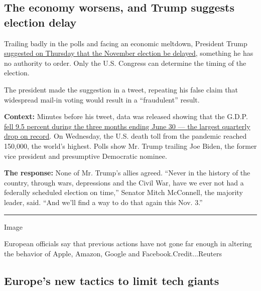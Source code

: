 \hypertarget{the-economy-worsens-and-trump-suggests-election-delay}{%
\subsection{The economy worsens, and Trump suggests election
delay}\label{the-economy-worsens-and-trump-suggests-election-delay}}

Trailing badly in the polls and facing an economic meltdown, President
Trump
\href{https://www.nytimes.com/2020/07/30/us/elections/biden-vs-trump.html}{suggested
on Thursday that the November election be delayed}, something he has no
authority to order. Only the U.S. Congress can determine the timing of
the election.

The president made the suggestion in a tweet, repeating his false claim
that widespread mail-in voting would result in a ``fraudulent'' result.

\textbf{Context:} Minutes before his tweet, data was released showing
that the G.D.P.
\href{https://www.nytimes.com/live/2020/07/30/business/stock-market-today-coronavirus?action=click\&module=Top\%20Stories\&pgtype=Homepage}{fell
9.5 percent during the three months ending June 30 --- the largest
quarterly drop on record}. On Wednesday, the U.S. death toll from the
pandemic reached 150,000, the world's highest. Polls show Mr. Trump
trailing Joe Biden, the former vice president and presumptive Democratic
nominee.

\textbf{The response:} None of Mr. Trump's allies agreed. ``Never in the
history of the country, through wars, depressions and the Civil War,
have we ever not had a federally scheduled election on time,'' Senator
Mitch McConnell, the majority leader, said. ``And we'll find a way to do
that again this Nov. 3.''

\begin{center}\rule{0.5\linewidth}{\linethickness}\end{center}

Image

European officials say that previous actions have not gone far enough in
altering the behavior of Apple, Amazon, Google and
Facebook.Credit...Reuters

\hypertarget{europes-new-tactics-to-limit-tech-giants}{%
\subsection{Europe's new tactics to limit tech
giants}\label{europes-new-tactics-to-limit-tech-giants}}

